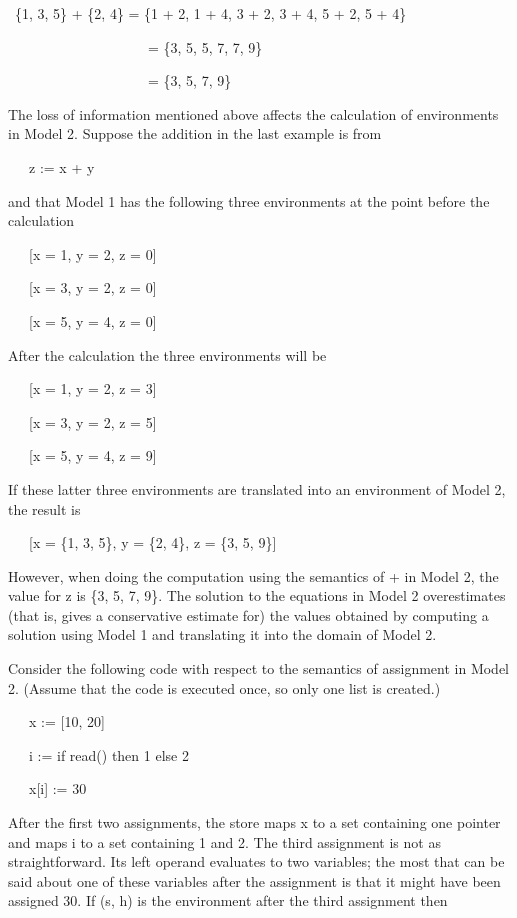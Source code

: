 {\ttfamily\mdseries
\ \{1, 3, 5\} + \{2, 4\} = \{1 + 2, 1 + 4, 3 + 2, 3 + 4, 5 + 2, 5 + 4\}}

{\ttfamily\mdseries
\ \ \ \ \ \ \ \ \ \ \ \ \ \ \ \ \ \ \ \ = \{3, 5, 5, 7, 7, 9\}}

{\ttfamily\mdseries
\ \ \ \ \ \ \ \ \ \ \ \ \ \ \ \ \ \ \ \ = \{3, 5, 7, 9\}}

The loss of information mentioned above affects the calculation of
environments in Model 2. Suppose the addition in the last example is
from

{\ttfamily\mdseries
\ \ \ z := x + y}

\noindent and that Model 1 has the following three environments at the
point before the calculation

{\ttfamily\mdseries
\ \ \ [x = 1, y = 2, z = 0]}

{\ttfamily\mdseries
\ \ \ [x = 3, y = 2, z = 0]}

{\ttfamily\mdseries
\ \ \ [x = 5, y = 4, z = 0]}

After the calculation the three environments will be 

{\ttfamily\mdseries
\ \ \ [x = 1, y = 2, z = 3]}

{\ttfamily\mdseries
\ \ \ [x = 3, y = 2, z = 5]}

{\ttfamily\mdseries
\ \ \ [x = 5, y = 4, z = 9]}

If these latter three environments are translated into an environment
of Model 2, the result is

{\ttfamily\mdseries
\ \ \ [x = \{1, 3, 5\}, y = \{2, 4\}, z = \{3, 5, 9\}]}

However, when doing the computation using the semantics of + in Model
2, the value for z is \{3, 5, 7, 9\}. The solution to the equations in
Model 2 overestimates (that is, gives a conservative estimate for) the
values obtained by computing a solution using Model 1 and translating
it into the domain of Model 2.

Consider the following code with respect to the semantics of
assignment in Model 2. (Assume that the code is executed once, so only
one list is created.)

{\ttfamily\mdseries
\ \ \ x := [10, 20]}

{\ttfamily\mdseries
\ \ \ i := if read() then 1 else 2}

{\ttfamily\mdseries
\ \ \ x[i] := 30}

After the first two assignments, the store maps x to a set containing
one pointer and maps i to a set containing 1 and 2. The third
assignment is not as straightforward. Its left operand evaluates to
two variables; the most that can be said about one of these variables
after the assignment is that it might have been assigned 30. If (s, h)
is the environment after the third assignment then


